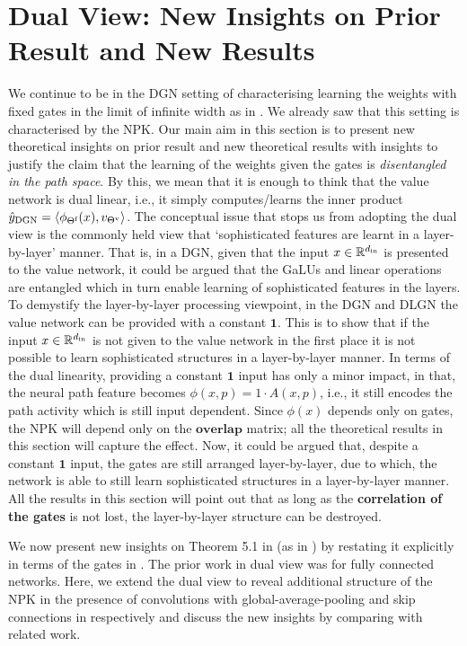 \section{Dual View: New Insights on Prior Result and New Results}\label{sec:analysis}
 We continue to be in the DGN setting of characterising learning the weights with fixed gates in the limit of infinite width as in . We already saw that this setting is characterised by the NPK. Our main aim in this section is to present new theoretical insights on prior result and new theoretical results with insights to justify the claim that the learning of the weights given the gates is \emph{disentangled in the path space}. By this, we mean that it is enough to think that the value network is dual linear, i.e., it simply computes/learns the inner product $\hat{y}_{\text{DGN}}=\langle \phi_{\Theta^{\textrm{f}}}(x),v_{{\Theta}^{\text{v}}}\rangle$. The conceptual issue that stops us from adopting the dual view is the commonly held view that `sophisticated features are learnt in a layer-by-layer' manner. That is, in a DGN, given that the input $x\in\mathbb{R}^{d_{\text{in}}}$  is presented to the value network, it could be argued that the GaLUs and linear operations are entangled which in turn enable learning of sophisticated features in the layers. To demystify the layer-by-layer processing viewpoint, in the DGN and DLGN the value network can be provided with a constant $\mathbf{1}$. This is to show that if the input $x\in\mathbb{R}^{d_{\text{in}}}$ is not given to the value network in the first place it is not possible to learn sophisticated structures in a layer-by-layer manner. In terms of the dual linearity, providing a constant $\mathbf{1}$ input has only a minor impact, in that, the neural path feature becomes $\phi(x,p)=1\cdot A(x,p)$, i.e., it still encodes the path activity which is still input dependent. Since $\phi(x)$ depends only on gates, the NPK will depend only on the $\textbf{overlap}$ matrix; all the theoretical results in this section will capture the effect. Now, it could be argued that, despite a constant $\mathbf{1}$ input, the gates are still arranged layer-by-layer, due to which, the network is able to still learn sophisticated structures in a layer-by-layer manner. All the results in this section will point out that as long as the \textbf{correlation of the gates} is not lost, the layer-by-layer structure can be destroyed.

We now present new insights on Theorem 5.1 in \citep{npk} (as in ) by restating it explicitly in terms of the gates in . The prior work in dual view was for fully connected networks. Here, we extend the dual view to reveal additional structure of the NPK in the presence of convolutions with global-average-pooling and skip connections in  respectively and discuss the new insights by comparing with related work.


